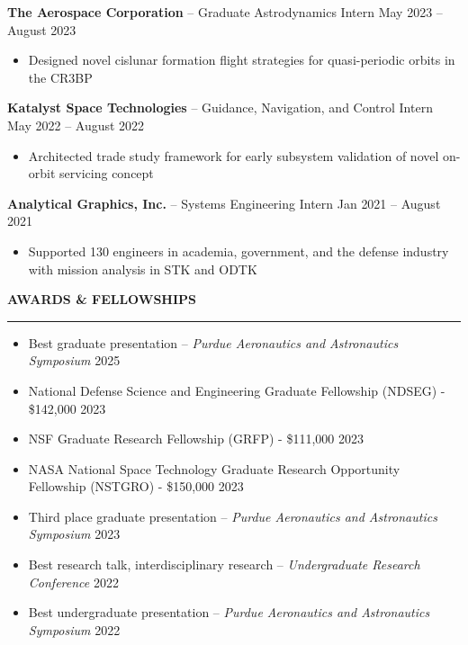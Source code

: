 \documentclass[10pt, a4paper]{article}
\newcommand{\sectiontitle}[1]{{\Large \textbf{#1}}\vspace{0.5em}\hrule\vspace{0.5em}}
\begin{document}
\textbf{The Aerospace Corporation} -- Graduate Astrodynamics Intern \hfill May 2023 -- August 2023
\begin{itemize}[noitemsep]
    \item Designed novel cislunar formation flight strategies for quasi-periodic orbits in the CR3BP
\end{itemize}

\textbf{Katalyst Space Technologies} -- Guidance, Navigation, and Control Intern \hfill May 2022 -- August 2022
\begin{itemize}[noitemsep]
    \item Architected trade study framework for early subsystem validation of novel on-orbit servicing concept
\end{itemize}

\textbf{Analytical Graphics, Inc.} -- Systems Engineering Intern \hfill Jan 2021 -- August 2021
\begin{itemize}[noitemsep]
    \item Supported 130 engineers in academia, government, and the defense industry with mission analysis in STK and ODTK
\end{itemize}
\vspace{7px}

\sectiontitle{AWARDS \& FELLOWSHIPS}
\begin{itemize}[noitemsep]
    \item Best graduate presentation -- \textit{Purdue Aeronautics and Astronautics Symposium} \hfill 2025
    \item National Defense Science and Engineering Graduate Fellowship (NDSEG) - \$142,000 \hfill 2023
    \item NSF Graduate Research Fellowship (GRFP) - \$111,000 \hfill 2023
    \item NASA National Space Technology Graduate Research Opportunity Fellowship (NSTGRO) - \$150,000 \hfill 2023
    \item Third place graduate presentation -- \textit{Purdue Aeronautics and Astronautics Symposium} \hfill 2023
    \item Best research talk, interdisciplinary research -- \textit{Undergraduate Research Conference} \hfill 2022
    \item Best undergraduate presentation -- \textit{Purdue Aeronautics and Astronautics Symposium} \hfill 2022
\end{itemize}
\end{document}
